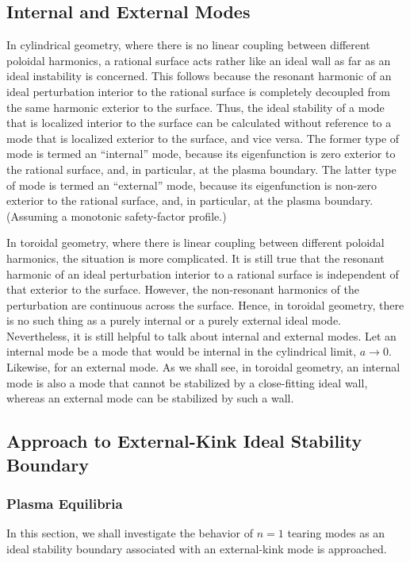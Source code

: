 \documentclass[12pt,prb,aps]{revtex4-1}
\begin{document}
\subsection{Internal and External Modes}
In cylindrical geometry, where there is no linear coupling between different poloidal harmonics, a rational surface acts rather like an ideal wall as far as an ideal instability is concerned.  This
follows because the resonant harmonic of an ideal perturbation interior to the rational surface is completely decoupled from the same harmonic exterior to the surface. Thus, the
ideal stability of a mode that is localized interior to the surface can be calculated without reference to a mode that is localized exterior to the surface, and vice versa. The former
type of mode is termed an  ``internal''  mode, because its eigenfunction is zero exterior to the rational surface, and, in particular, at the plasma boundary. The latter
type of mode is termed an  ``external'' mode, because its eigenfunction is non-zero exterior to the rational surface, and, in particular, at the plasma boundary. (Assuming a monotonic
safety-factor profile.)

In toroidal geometry, where there is linear coupling between different poloidal harmonics, the situation is more complicated. It is still true that the resonant harmonic of
an ideal perturbation interior to a rational surface is independent of that exterior to the surface. However, the non-resonant harmonics of the perturbation are
continuous across the surface. Hence, in toroidal geometry, there is no such thing as a purely internal or a purely external ideal mode. Nevertheless, it is
still helpful to talk about internal and external modes.  Let an internal mode be a mode that would be internal in the cylindrical limit, $a\rightarrow 0$. 
Likewise, for an external mode. As we shall see,  in toroidal geometry, an internal mode is also a mode that cannot be
stabilized by a close-fitting ideal wall, whereas an external mode can be stabilized by such a wall. 

\subsection{Approach to External-Kink Ideal Stability Boundary} \label{external}
\subsubsection{Plasma Equilibria}
In this section, we shall investigate the behavior of $n=1$ tearing modes as an ideal stability boundary associated with an  external-kink mode is approached. 
\end{document}
